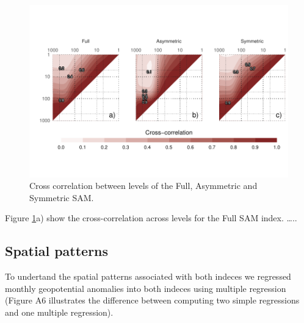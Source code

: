 \documentclass[]{ametsocV5}
\begin{document}
\begin{figure}
\includegraphics{cross-correlation-1} \caption[Cross correlation between levels of the Full, Asymmetric and Symmetric SAM]{Cross correlation between levels of the Full, Asymmetric and Symmetric SAM.}\label{fig:cross-correlation}
\end{figure}

Figure \ref{fig:cross-correlation}a) show the cross-correlation across
levels for the Full SAM index. \ldots{}..

\subsection{Spatial patterns}

To undertand the spatial patterns associated with both indeces we
regressed monthly geopotential anomalies into both indeces using
multiple regression (Figure A6 illustrates the difference between
computing two simple regressions and one multiple regression).
\end{document}
